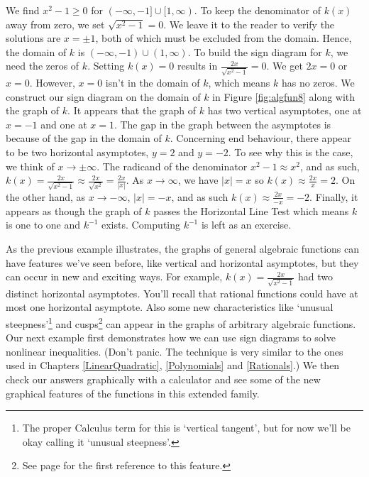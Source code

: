 {\begin{enumerate}
We find $x^2 - 1 \geq 0$ for $(-\infty, -1] \cup [1, \infty)$.  To keep the denominator of $k(x)$ away from zero, we set $\sqrt{x^2-1} = 0$. We leave it to the reader to verify the solutions are $x = \pm 1$, both of which must be excluded from the domain.    Hence, the domain of $k$ is $(-\infty, -1) \cup (1,\infty)$.  To build the sign diagram for $k$, we need the zeros of $k$.  Setting $k(x) = 0$ results in $\frac{2x}{\sqrt{x^2 - 1}}= 0$.  We get $2x =0$ or $x=0$.  However, $x=0$ isn't in the domain of $k$, which means $k$ has no zeros.  We construct our sign diagram on the domain of $k$ in Figure \ref{fig:algfun8} along with the graph of $k$. It appears that the graph of $k$ has two vertical asymptotes, one at $x=-1$ and one at $x=1$.   The gap in the graph between the asymptotes is because of the gap in the domain of $k$. Concerning end behaviour, there appear to be two horizontal asymptotes, $y = 2$ and $y=-2$.  To see why this is the case, we think of $x\rightarrow \pm \infty$.   The radicand of the denominator $x^2 - 1 \approx x^2$, and as such, $k(x) = \frac{2x}{\sqrt{x^2 - 1}} \approx \frac{2x}{\sqrt{x^2}} = \frac{2x}{|x|}$.  As $x \rightarrow \infty$, we have $|x| = x$ so $k(x) \approx \frac{2x}{x} = 2$.  On the other hand, as $x \rightarrow -\infty$, $|x| = -x$, and as such $k(x) \approx \frac{2x}{-x} = -2$. Finally, it appears as though the graph of $k$ passes the Horizontal Line Test which means $k$ is one to one and $k^{-1}$ exists.  Computing $k^{-1}$ is left as an exercise.

\end{enumerate}
}

As the previous example illustrates, the graphs of general algebraic functions can have features we've seen before, like vertical and horizontal asymptotes, but they can occur in new and exciting ways. For example, $k(x) = \frac{2x}{\sqrt{x^{2} - 1}}$ had two distinct horizontal asymptotes.  You'll recall that rational functions could have at most one horizontal asymptote.  Also some new characteristics like `unusual steepness'\footnote{The proper Calculus term for this is `vertical tangent', but for now we'll be okay calling it `unusual steepness'.} and cusps\footnote{See page \pageref{cusppicture} for the first reference to this feature.} can appear in the graphs of arbitrary algebraic functions.   Our next example first demonstrates how we can use sign diagrams to solve nonlinear inequalities. (Don't panic.  The technique is very similar to the ones used in Chapters \ref{LinearQuadratic}, \ref{Polynomials} and \ref{Rationals}.)  We then check our answers graphically with a calculator and see some of the new graphical features of the functions in this extended family.

